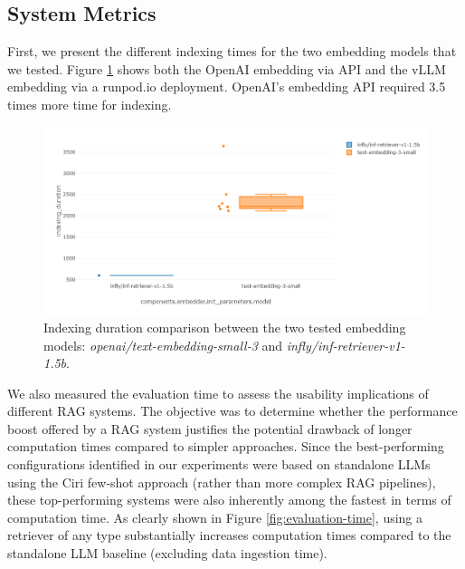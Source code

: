 \subsection{System Metrics}

First, we present the different indexing times for the two embedding models that we tested. Figure \ref{fig:indexing-time} shows both the OpenAI embedding via API and the vLLM embedding via a runpod.io deployment. OpenAI's embedding API required 3.5 times more time for indexing.

\begin{figure}[!ht]
    \centering
    \includegraphics[width=\textwidth]{images/indexing-time.png}
    \caption{Indexing duration comparison between the two tested embedding models: \textit{openai/text-embedding-small-3} and \textit{infly/inf-retriever-v1-1.5b}.}
    \label{fig:indexing-time}
\end{figure}

We also measured the evaluation time to assess the usability implications of different RAG systems. The objective was to determine whether the performance boost offered by a RAG system justifies the potential drawback of longer computation times compared to simpler approaches. Since the best-performing configurations identified in our experiments were based on standalone LLMs using the Ciri few-shot approach (rather than more complex RAG pipelines), these top-performing systems were also inherently among the fastest in terms of computation time. As clearly shown in Figure \ref{fig:evaluation-time}, using a retriever of any type substantially increases computation times compared to the standalone LLM baseline (excluding data ingestion time). 

